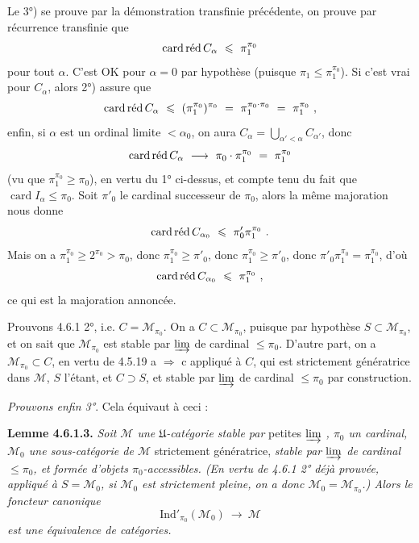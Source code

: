 \documentclass[11pt]{article}
\newcommand{\printedpage}[1]{\marginpar{\footnotesize p.~#1}}
\newcommand{\msp}[1]{\marginpar{\footnotesize [#1]}}
\newcommand{\cardred}{\mathop{\mathrm{card}\,\textup{réd}}\nolimits}
\newcommand{\Ind}{\mathrm{Ind}}
\begin{document}
Le 3°) se prouve par la démonstration transfinie précédente, on prouve par récurrence transfinie que
\[
\cardred C_\alpha \ \leqslant\ \pi_1^{\pi_0}
\]
pour tout $\alpha$. C'est OK pour $\alpha=0$ par hypothèse (puisque $\pi_1\leqslant\pi_1^{\pi_0}$). Si c'est vrai pour $C_\alpha$, alors 2°) assure que
\[
\cardred C_\alpha \ \leqslant\ (\pi_1^{\pi_0})^{\pi_0} \ =\ \pi_1^{\pi_0\cdot\pi_0} \ =\ \pi_1^{\pi_0}\ , %
\]
enfin, si $\alpha$ est un ordinal limite $<\alpha_0$, on aura $C_\alpha=\bigcup_{\alpha'<\alpha}C_{\alpha'}$, donc
\[
\cardred C_\alpha \ \longrightarrow\ \pi_0\cdot\pi_1^{\pi_0} \ =\ \pi_1^{\pi_0} %
\]
(vu que $\pi_1^{\pi_0}\geqslant\pi_0$), en vertu du 1° ci-dessus, et compte tenu du fait que $\operatorname{card}I_\alpha\leqslant\pi_0$. Soit $\pi'_0$ le cardinal successeur de $\pi_0$, alors la même majoration nous donne
\[
\cardred C_{\alpha_0} \ \leqslant\ \pi'_0\pi_1^{\pi_0}\ .
\]
\printedpage{46}
Mais on a $\pi_1^{\pi_0}\geqslant2^{\pi_0}>\pi_0$, donc $\pi_1^{\pi_0}\geqslant\pi'_0$, donc $\pi_1^{\pi_0}\geqslant\pi'_0$, donc $\pi'_0\pi_1^{\pi_0}=\pi_1^{\pi_0}$, d'où
\[
\cardred C_{\alpha_0} \ \leqslant\ \pi_1^{\pi_0}\ ,
\]
ce qui est la majoration annoncée.

\msp{page 144}

Prouvons 4.6.1 2°, i.e. $C=\mathcal{M}_{\pi_0}$. On a $C\subset\mathcal{M}_{\pi_0}$, puisque par hypothèse $S\subset\mathcal{M}_{\pi_0}$, et on sait que $\mathcal{M}_{\pi_0}$ est stable par $\varinjlim$ de cardinal $\leqslant\pi_0$. D'autre part, on a $\mathcal{M}_{\pi_0}\subset C$, en vertu de 4.5.19 a $\Longrightarrow$ c appliqué à $C$, qui est strictement génératrice dans $\mathcal{M}$, $S$ l'étant, et $C\supset S$, et stable par $\varinjlim$ de cardinal $\leqslant\pi_0$ par construction.

\textit{Prouvons enfin 3°}. Cela équivaut à ceci :

\textbf{Lemme 4.6.1.3.} \textit{Soit $\mathcal{M}$ une $\mathfrak{U}$-catégorie stable par} petites \textit{$\varinjlim$ , $\pi_0$ un cardinal, $\mathcal{M}_0$ une sous-catégorie de $\mathcal{M}$} strictement génératrice, \textit{stable par $\varinjlim$ de cardinal $\leqslant\pi_0$, et formée d'objets $\pi_0$-accessibles. (En vertu de 4.6.1 2° déjà prouvée, appliqué à $S=\mathcal{M}_0$, si $\mathcal{M}_0$ est strictement pleine, on a donc $\mathcal{M}_0=\mathcal{M}_{\pi_0}$.) Alors le foncteur canonique}
\[
\Ind'_{\pi_0}(\mathcal{M}_0) \ \longrightarrow\ \mathcal{M}
\]
\textit{est une équivalence de catégories.}
\end{document}
